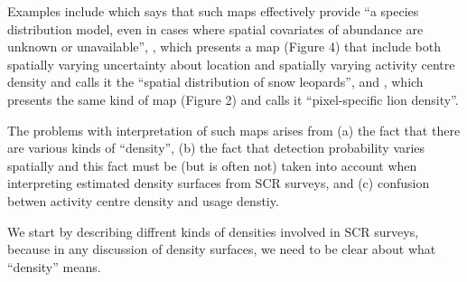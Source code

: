 \documentclass[10pt,a4paper]{article}
\begin{document}
Examples include \cite{Dorzaio+Karanth:17} which says that such maps effectively provide  ``a species distribution model, even in cases where spatial covariates of abundance are unknown or unavailable'', \cite{Alexander+al:15}, which presents a map (Figure 4) that include both spatially varying uncertainty about location and spatially varying activity centre density and calls it the ``spatial distribution of snow leopards'', and \cite{Elliot+Gopalaswamy:16}, which presents the same kind of map (Figure 2) and calls it ``pixel-specific lion density''. 

The problems with interpretation of such maps arises from (a) the fact that there are various kinds of ``density'', (b) the fact that detection probability varies spatially and this fact must be (but is often not) taken into account when interpreting estimated density surfaces from SCR surveys, and (c) confusion betwen activity centre density and usage denstiy. 

We start by describing diffrent kinds of densities involved in SCR surveys, because in any discussion of density surfaces, we need to be clear about what ``density'' means. %

\end{document}
